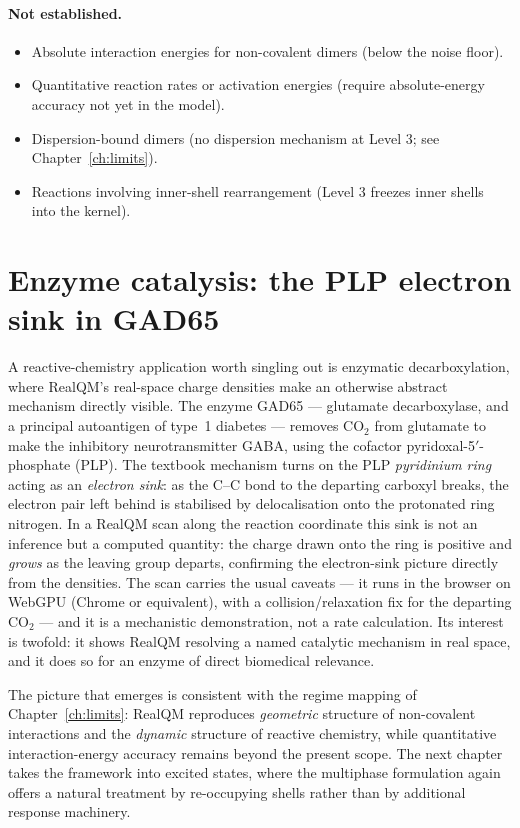 \paragraph{Not established.}
\begin{itemize}
\item Absolute interaction energies for non-covalent dimers (below the noise floor).
\item Quantitative reaction rates or activation energies (require absolute-energy accuracy not yet in the model).
\item Dispersion-bound dimers (no dispersion mechanism at Level 3; see Chapter~\ref{ch:limits}).
\item Reactions involving inner-shell rearrangement (Level 3 freezes inner shells into the kernel).
\end{itemize}

\section{Enzyme catalysis: the PLP electron sink in GAD65}\label{sec:gad65}

A reactive-chemistry application worth singling out is enzymatic decarboxylation, where RealQM's real-space
charge densities make an otherwise abstract mechanism directly visible. The enzyme GAD65 --- glutamate
decarboxylase, and a principal autoantigen of type~1 diabetes --- removes CO$_2$ from glutamate to make the
inhibitory neurotransmitter GABA, using the cofactor pyridoxal-5$'$-phosphate (PLP). The textbook mechanism turns
on the PLP \emph{pyridinium ring} acting as an \emph{electron sink}: as the C--C bond to the departing carboxyl
breaks, the electron pair left behind is stabilised by delocalisation onto the protonated ring nitrogen. In a
RealQM scan along the reaction coordinate this sink is not an inference but a computed quantity: the charge drawn
onto the ring is positive and \emph{grows} as the leaving group departs, confirming the electron-sink picture
directly from the densities. The scan carries the usual caveats --- it runs in the browser on WebGPU (Chrome or
equivalent), with a collision/relaxation fix for the departing CO$_2$ --- and it is a mechanistic demonstration,
not a rate calculation. Its interest is twofold: it shows RealQM resolving a named catalytic mechanism in real
space, and it does so for an enzyme of direct biomedical relevance.

The picture that emerges is consistent with the regime mapping of Chapter~\ref{ch:limits}: RealQM reproduces \emph{geometric} structure of non-covalent interactions and the \emph{dynamic} structure of reactive chemistry, while quantitative interaction-energy accuracy remains beyond the present scope. The next chapter takes the framework into excited states, where the multiphase formulation again offers a natural treatment by re-occupying shells rather than by additional response machinery.

